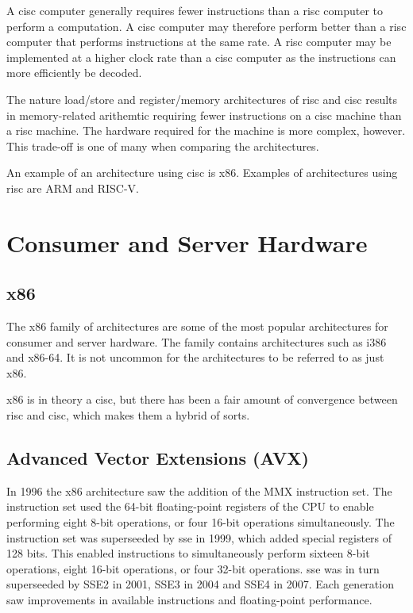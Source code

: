 A \gls{cisc} computer generally requires fewer instructions than a \gls{risc} computer to perform a computation. A \gls{cisc} computer may therefore perform better than a \gls{risc} computer that performs instructions at the same rate. A \gls{risc} computer may be implemented at a higher clock rate than a \gls{cisc} computer as the instructions can more efficiently be decoded\cite{carter2002}.

The nature load/store and register/memory architectures of \gls{risc} and \gls{cisc} results in memory-related arithemtic requiring fewer instructions on a \gls{cisc} machine than a \gls{risc} machine. The hardware required for the machine is more complex, however. This trade-off is one of many when comparing the architectures\cite{carter2002}.

An example of an architecture using \gls{cisc} is \gls{x86}. Examples of architectures using \gls{risc} are ARM and RISC-V.

\section{Consumer and Server Hardware}

\subsection{x86}

The \gls{x86} family of architectures are some of the most popular architectures for consumer and server hardware. The family contains architectures such as i386 and x86-64. It is not uncommon for the architectures to be referred to as just \gls{x86}\cite{carter2002}.

\gls{x86} is in theory a \gls{cisc}, but there has been a fair amount of convergence between \gls{risc} and \gls{cisc}, which makes them a hybrid of sorts\cite{carter2002}.

\subsection{Advanced Vector Extensions (AVX)}

In 1996 the x86 architecture saw the addition of the MMX instruction set. The instruction set used the 64-bit floating-point registers of the CPU to enable performing eight 8-bit operations, or four 16-bit operations simultaneously. The instruction set was superseeded by \gls{sse} in 1999, which added special registers of 128 bits. This enabled instructions to simultaneously perform sixteen 8-bit operations, eight 16-bit operations, or four 32-bit operations. \gls{sse} was in turn superseeded by SSE2 in 2001, SSE3 in 2004 and SSE4 in 2007. Each generation saw improvements in available instructions and floating-point performance\cite{hennessy2011:avx}.

